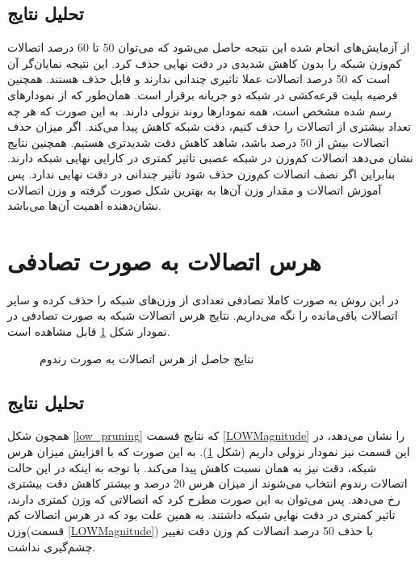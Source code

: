 \subsection{تحلیل نتایج}
از آزمایش‌های انجام شده این نتیجه حاصل می‌شود که می‌توان 50 تا 60 درصد اتصالات کم‌وزن شبکه 
را بدون کاهش شدیدی در دقت نهایی حذف کرد. این نتیجه نمایان‌گر آن است که 50 درصد اتصالات عملا تاثیری چندانی ندارند و قابل حذف هستند. همچنین فرضیه بلیت قرعه‌کشی در شبکه دو جریانه
برقرار است.
همان‌طور که از نمودار‌های رسم شده مشخص است، همه نمودار‌ها روند نزولی دارند. به این صورت که هر چه تعداد بیشتری از اتصالات را حذف کنیم، دقت شبکه کاهش پیدا می‌کند. اگر میزان حدف اتصالات بیش از 50 درصد باشد، شاهد کاهش دقت شدیدتری هستیم.
\newline
همچنین نتایج نشان می‌دهد اتصالات کم‌وزن در شبکه عصبی تاثیر کمتری در کارایی نهایی شبکه دارند. بنابراین اگر نصف اتصالات کم‌وزن حذف شود تاثیر چندانی در دقت نهایی ندارد. پس آموزش اتصالات و مقدار وزن آن‌ها به بهترین شکل صورت گرفته و وزن اتصالات نشان‌دهنده اهمیت آن‌ها می‌باشد.

\section{هرس اتصالات به صورت تصادفی}

	در این روش به صورت کاملا تصادفی تعدادی از وزن‌های شبکه را حذف کرده و سایر اتصالات باقی‌مانده را نگه می‌داریم. نتایج هرس اتصالات شبکه
	به صورت تصادفی در نمودار شکل \ref{random_pruning} قابل مشاهده است.
	
	
\begin{figure}[H]		  		    
	\caption{نتایج حاصل از هرس اتصالات به صورت رندوم}
	\label{random_pruning}
\end{figure}
\subsection{تحلیل نتایج}	
همچون شکل \ref{low_pruning} که نتایج قسمت \ref{LOWMagnitude} را نشان می‌دهد، در این قسمت نیز نمودار نزولی داریم (شکل \ref{random_pruning}). به این صورت که با افزایش میزان هرس شبکه، دقت نیز به همان نسبت کاهش پیدا می‌کند. با توجه به اینکه در این حالت اتصالات رندوم انتخاب می‌شوند از میزان هرس 20 درصد و بیشتر کاهش دقت بیشتری رخ می‌دهد. پس می‌توان به این صورت مطرح کرد که اتصالاتی که وزن کمتری دارند، تاثیر کمتری در دقت نهایی شبکه داشتند. به همین علت بود که در هرس اتصالات کم وزن(قسمت \ref{LOWMagnitude}) با حذف 50 درصد اتصالات کم وزن دقت تغییر چشم‌گیری نداشت.

